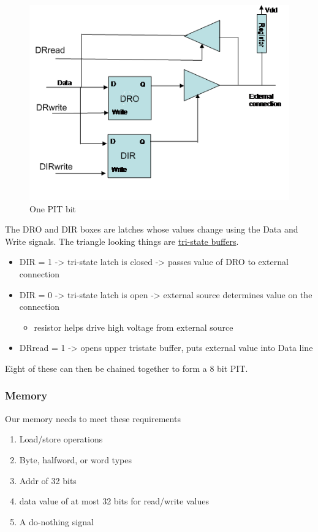 \documentclass[../notes.tex]{subfiles}
\begin{document}
\begin{figure}[H]
	\centering
	\includegraphics[width=0.8\linewidth]{img/image_2022-10-16-00-30-46.png}
	\caption{One PIT bit}
\end{figure}

The DRO and DIR boxes are latches whose values change using the Data and Write signals. The triangle looking things are \href{https://en.wikipedia.org/wiki/Three-state_logic}{tri-state buffers}.

\begin{itemize}
	\item DIR = 1 -> tri-state latch is closed -> passes value of DRO to external connection
	\item DIR = 0 -> tri-state latch is open -> external source determines value on the connection
		\begin{itemize}
			\item resistor helps drive high voltage from external source
		\end{itemize}
	\item DRread = 1 -> opens upper tristate buffer, puts external value into Data line
\end{itemize}

Eight of these can then be chained together to form a 8 bit PIT.


\subsubsection{Memory}

Our memory needs to meet these requirements

\begin{enumerate}
	\item Load/store operations
	\item Byte, halfword, or word types
	\item Addr of 32 bits
	\item data value of at most 32 bits for read/write values
	\item A do-nothing signal
\end{enumerate}
\end{document}
